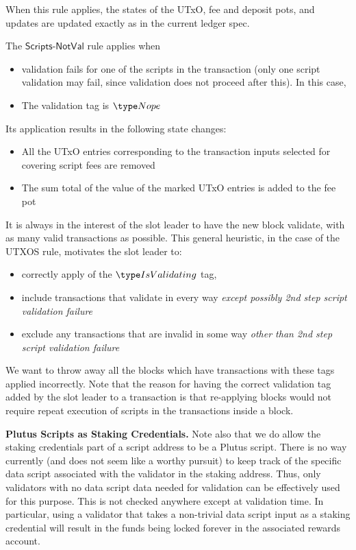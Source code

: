 When this rule applies, the states of the UTxO, fee
  and deposit pots, and updates are updated exactly as in the current
  ledger spec.

The $\mathsf{Scripts\mbox{-}NotVal}$ rule applies when

\begin{itemize}
  \item validation fails
  for one of the scripts in the transaction (only one script validation may fail,
  since validation does not proceed after this). In this case,
  \item The validation tag is $\Nope$
\end{itemize}

Its application results in the following state changes:

\begin{itemize}
  \item All the
  UTxO entries corresponding to the transaction inputs selected for covering
  script fees are removed

  \item The sum total of the value of the marked UTxO entries
  is added to the fee pot
\end{itemize}

It is always in the interest of the slot leader to have the new block validate,
with as many valid transactions as possible. This general heuristic,
in the case of the UTXOS rule, motivates the
slot leader to:

\begin{itemize}
  \item correctly apply of the $\IsValidating$ tag,
  \item include transactions that validate in every way
  \textit{except possibly 2nd step script validation failure}
  \item exclude any transactions that are invalid
in some way \textit{other than 2nd step script validation failure}
\end{itemize}

We want to
throw away all the blocks which have transactions with these tags
applied incorrectly.
Note that the reason for having the correct validation tag added by the slot leader
to a transaction is that re-applying blocks would not require repeat
execution of scripts in the transactions inside a block.

\textbf{Plutus Scripts as Staking Credentials.}
Note also that we do allow the staking credentials part of a script
address to be a Plutus script. There is no way currently (and does not seem
like a worthy pursuit) to keep track of the specific data script associated with
the validator in the staking address. Thus, only validators with no
data script data needed for validation can be effectively used for this purpose.
This is not checked anywhere except at validation time. In particular,
using a validator that takes a non-trivial data script input as a staking credential
will result in the funds being locked forever in the associated rewards account.

